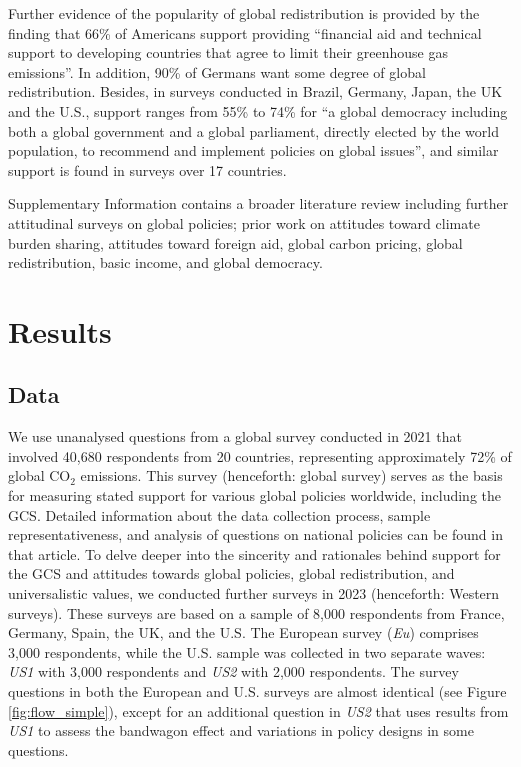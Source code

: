\documentclass[12pt,english]{article}
\begin{document}
Further evidence of the popularity of global redistribution is provided by the finding that 66\% of Americans support providing ``financial aid and technical support to developing countries that agree to limit their greenhouse gas emissions''.\cite{leiserowitz_public_2021} In addition, 90\% of Germans want some degree of global redistribution.\cite{fehr_your_2022} 
Besides, in surveys conducted in Brazil, Germany, Japan, the UK and the U.S., support ranges from 55\% to 74\% for ``a global democracy including both a global government and a global parliament, directly elected by the world population, to recommend and implement policies on global issues'', and similar support is found in surveys over 17 countries.\cite{ghassim_who_2020,ghassim_who_2024} %

Supplementary Information contains a broader literature review including further attitudinal surveys on global policies; prior work on attitudes toward climate burden sharing, attitudes toward foreign aid, global carbon pricing, global redistribution, basic income, and global democracy.

\section{Results}

\subsection{Data}\label{subsec:data}

We use unanalysed questions from a global survey conducted in 2021 that involved 40,680 respondents from 20 countries, representing approximately 72\% of global CO$_\text{2}$ emissions. 
This survey (henceforth: global survey) serves as the basis for measuring stated support for various global policies worldwide, including the GCS. 
Detailed information about the data collection process, sample representativeness, and analysis of questions on national policies can be found in that article.\cite{dechezlepretre_fighting_nodate}
To delve deeper into the sincerity and rationales behind support for the GCS and attitudes towards global policies, global redistribution, and universalistic values, we conducted further surveys  in 2023 (henceforth: Western surveys). These surveys are based on a sample of 8,000 respondents from France, Germany, Spain, the UK, and the U.S. The European survey (\textit{Eu}) comprises 3,000 respondents, while the U.S. sample was collected in two separate waves: \textit{US1} with 3,000 respondents and \textit{US2} with 2,000 respondents. The survey questions in both the European and U.S. surveys are almost identical (see Figure \ref{fig:flow_simple}), except for an additional question in \textit{US2} that uses results from \textit{US1} to assess the bandwagon effect and variations in policy designs in some questions.
\end{document}
